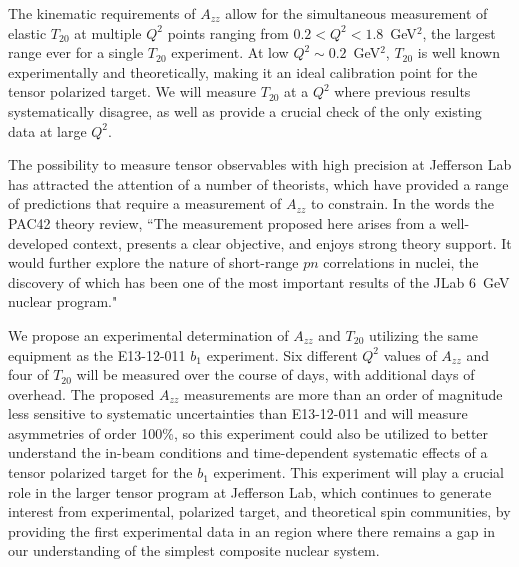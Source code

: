The kinematic requirements of $A_{zz}$ allow for the simultaneous measurement of elastic $T_{20}$ at multiple $Q^2$ points ranging from $0.2<Q^2<1.8$~GeV$^2$, the largest range ever for a single $T_{20}$ experiment. At low $Q^2\sim0.2$~GeV$^2$, $T_{20}$ is well known experimentally and theoretically, making it an ideal calibration point for the tensor polarized target. We will measure $T_{20}$ at a $Q^2$ where previous results systematically disagree, as well as provide a crucial check of the only existing data at large $Q^2$.



The possibility to measure tensor observables with high precision at Jefferson Lab has attracted the attention of a number of theorists, which have provided a range of predictions that require a measurement of $A_{zz}$ to constrain. 
In the words the PAC42 theory review, ``The measurement proposed here arises from a well-developed context, presents a clear objective, and enjoys strong theory support. It would further explore the nature of short-range $pn$ correlations in nuclei, the discovery of which has been one of the most important results of the JLab 6~GeV nuclear program." 

We propose an experimental determination of $A_{zz}$ and $T_{20}$ utilizing the same equipment as the E13-12-011 $b_1$ experiment.  Six different $Q^2$ values of $A_{zz}$ and four of $T_{20}$ will be measured over the course of \productiondays days, with \overheaddays additional days of overhead. The proposed $A_{zz}$ measurements are more than an order of magnitude less sensitive to systematic uncertainties than E13-12-011 and will measure asymmetries of order 100\%, so this experiment could also be utilized to better understand the in-beam conditions and time-dependent systematic effects of a tensor polarized target for the $b_1$ experiment. This experiment will play a crucial role in the larger tensor program at Jefferson Lab, which continues to generate interest from experimental, polarized target, and theoretical spin communities, by providing the first experimental data in an region where there remains a gap in our understanding of the simplest composite nuclear system.








